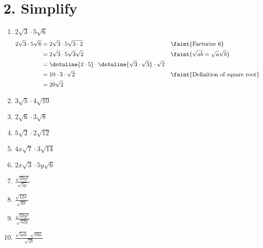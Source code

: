 \documentclass{hw}
\begin{document}
\section*{\normalsize 2. Simplify}
    \begin{enumerate}[label=\alph*.]
        \item $2\sqrt{3} \cdot 5\sqrt{6}$
            \textcolor{blue}{
            \begin{align*}
                2\sqrt{3} \cdot 5\sqrt{6} &= 2\sqrt{3} \cdot 5\sqrt{3 \cdot 2} & \leaders\hbox{A}\hfill & \faint{\text{Factorize } 6} \\
                                          &= 2\sqrt{3} \cdot 5\sqrt{3}\sqrt{2} && \faint{\sqrt{ab} = \sqrt{a}\sqrt{b}} \\
                                          &= \dotuline{2 \cdot 5} \cdot \dotuline{\sqrt{3} \cdot \sqrt{3}} \cdot \sqrt{2} \\ 
                                          &= 10 \cdot 3 \cdot \sqrt{2} && \faint{\text{Definition of square root}} \\
                                          &= 20 \sqrt{2}
            \end{align*}
            }
        \item $3\sqrt{5} \cdot 4\sqrt{10}$
            \studentxlargeworkspace
        \item $2\sqrt{6} \cdot 3\sqrt{8}$
            \studentxlargeworkspace
        \item $5\sqrt{2} \cdot 2\sqrt{12}$
            \studentxlargeworkspace
        \item $4x\sqrt{7} \cdot 3\sqrt{14}$
            \studentxlargeworkspace
        \item $2x\sqrt{3} \cdot 5y\sqrt{6}$
            \studentxlargeworkspace
        \item $\frac{\sqrt{20y^2}}{\sqrt{5y}}$
            \studentxlargeworkspace
        \item $\frac{\sqrt{12x}}{\sqrt{3x}}$
            \studentxlargeworkspace
        \item $\frac{\sqrt{50y^3}}{\sqrt{32y}}$
            \studentxlargeworkspace
        \item $\frac{\sqrt{5ab} \cdot \sqrt{10a}}{\sqrt{2b}}$
            \studentxlargeworkspace
    \end{enumerate} 
\end{document}
